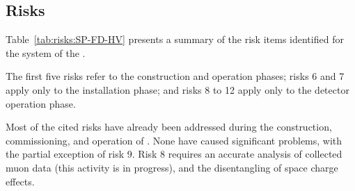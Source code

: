 \subsection{Risks}
\label{sec:fdsp-hv-org-risk}

Table~\ref{tab:risks:SP-FD-HV} presents a summary of the risk items identified for the  system of  the  . 



The first five risks refer to the construction and operation phases; risks 6 and 7 apply only to the installation phase; and risks 8 to 12 apply only to the  detector operation phase. %

Most of the cited risks have already been addressed during the construction, commissioning, and operation of . 
None have caused significant problems, with the partial exception of risk 9. %
Risk 8 requires an accurate analysis of collected muon data (this activity is in progress), and the disentangling of space charge effects. 

